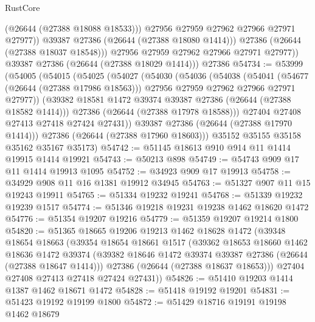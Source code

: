 \begin{lexlean}{RustCore}
\begin{coremodule}
                    (@26644 (@27388 @18088 @18533)))
                  @27956
                  @27959
                  @27962
                  @27966
                  @27971
                  @27977))
              @39387
              @27386
              (@26644 (@27388 @18080 @1414)))
            @27386
            (@26644 (@27388 @18037 @18548)))
          @27956
          @27959
          @27962
          @27966
          @27971
          @27977))
      @39387
      @27386
      (@26644 (@27388 @18029 @1414)))
    @27386
@54734 := @53999
    (@54005
      (@54015
        (@54025
          (@54027
            (@54030
              (@54036
                (@54038
                  (@54041
                    (@54677 (@26644 (@27388 @17986 @18563)))
                    @27956
                    @27959
                    @27962
                    @27966
                    @27971
                    @27977))
                (@39382 @18581 @1472 @39374 @39387 @27386 (@26644 (@27388 @18582 @1414)))
                @27386
                (@26644 (@27388 @17978 @18588)))
              @27404
              @27408
              @27413
              @27418
              @27424
              @27431))
          @39387
          @27386
          (@26644 (@27388 @17970 @1414)))
        @27386
        (@26644 (@27388 @17960 @18603)))
      @35152
      @35155
      @35158
      @35162
      @35167
      @35173)
@54742 := @51145 @18613 @910 @914 @11 @1414 @19915 @1414 @19921
@54743 := @50213 @898
@54749 := @54743 @909 @17 @11 @1414 @19913 @1095
@54752 := @34923 @909 @17 @19913
@54758 := @34929 @908 @11 @16 @1381 @19912 @34945
@54763 := @51327 @907 @11 @15 @19243 @19911
@54765 := @51334 @19232 @19241
@54768 := @51339 @19232 @19239 @1517
@54774 := @51346 @19218 @19231 @19238 @1462 @18620 @1472
@54776 := @51354 @19207 @19216
@54779 := @51359 @19207 @19214 @1800
@54820 := @51365
    @18665
    @19206
    @19213
    @1462
    @18628
    @1472
    (@39348
      @18654
      @18663
      (@39354
        @18654
        @18661
        @1517
        (@39362
          @18653
          @18660
          @1462
          @18636
          @1472
          @39374
          (@39382 @18646 @1472 @39374 @39387 @27386 (@26644 (@27388 @18647 @1414)))
          @27386
          (@26644 (@27388 @18637 @18653)))
        @27404
        @27408
        @27413
        @27418
        @27424
        @27431))
@54826 := @51410 @19203 @1414 @1387 @1462 @18671 @1472
@54828 := @51418 @19192 @19201
@54831 := @51423 @19192 @19199 @1800
@54872 := @51429
    @18716
    @19191
    @19198
    @1462
    @18679

\end{coremodule}
\end{lexlean}
